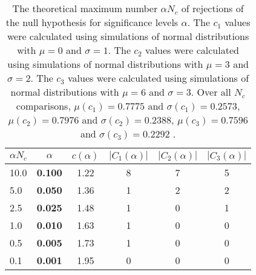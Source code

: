 \begin{table}[h!]
\begin{center}
\begin{tabular}{| l | c | c | c | c | c |}\hline
$\alpha N_c$ & $\alpha$ & $c(\alpha)$ & $|C_1(\alpha)|$ & $|C_2(\alpha)|$ & $|C_3(\alpha)|$ \\\hline\hline
10.0 & {\bf 0.100} & 1.22 & 8 & 7 & 5 \\\hline
5.0 & {\bf 0.050} & 1.36 & 1 & 2 & 2 \\\hline
2.5 & {\bf 0.025} & 1.48 & 1 & 0 & 1 \\\hline
1.0 & {\bf 0.010} & 1.63 & 1 & 0 & 0 \\\hline
0.5 & {\bf 0.005} & 1.73 & 1 & 0 & 0 \\\hline
0.1 & {\bf 0.001} & 1.95 & 0 & 0 & 0 \\\hline
\end{tabular}
\caption{The theoretical maximum number $\alpha N_c$ of rejections
        of the null hypothesis for significance levels $\alpha$.
        The $c_1$ values were calculated using simulations of normal distributions with $\mu=0$ and $\sigma=1$.
        The $c_2$ values were calculated using simulations of normal distributions with $\mu=3$ and $\sigma=2$.
        The $c_3$ values were calculated using simulations of normal distributions with $\mu=6$ and $\sigma=3$.
        Over all $N_c$ comparisons,
         $\mu(c_1)=0.7775$ and $\sigma(c_1)=0.2573$,
         $\mu(c_2)=0.7976$ and $\sigma(c_2)=0.2388$,
         $\mu(c_3)=0.7596$ and $\sigma(c_3)=0.2292$ .
        }
\end{center}
\end{table}